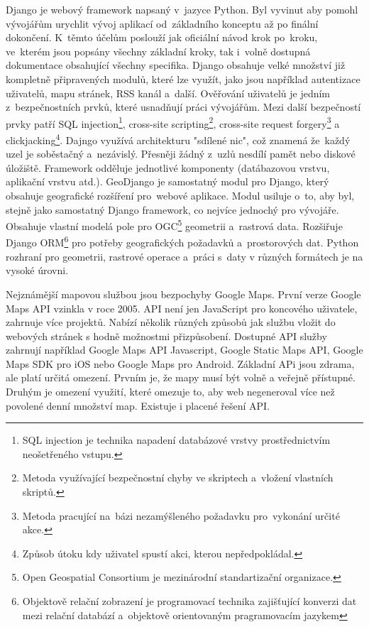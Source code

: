 \documentclass[12pt]{article}%
\begin{document}
{{%
Django je webový framework napsaný v~jazyce Python. Byl vyvinut aby pomohl vývojářům urychlit 
vývoj aplikací od~základního konceptu až po finální dokončení. K~těmto účelům poslouží jak oficiální 
návod krok po~kroku, ve~kterém jsou popsány všechny základní kroky, tak i~volně dostupná 
dokumentace obsahující všechny specifika. Django obsahuje velké množství již kompletně připravených 
modulů, které lze využít, jako jsou například autentizace uživatelů, mapu stránek, RSS kanál a~další. 
Ověřování uživatelů je jedním z~bezpečnostních prvků, které usnadňují práci vývojářům. Mezi další
bezpečností prvky patří SQL injection\footnote{SQL injection je technika napadení databázové vrstvy 
prostřednictvím neošetřeného vstupu.}, cross-site scripting\footnote{Metoda využívající bezpečnostní 
chyby ve skriptech a~vložení vlastních skriptů.}, cross-site request forgery\footnote{Metoda 
pracující na~bázi nezamýšleného požadavku pro~vykonání určité akce.} a clickjacking\footnote{Způsob 
útoku kdy uživatel spustí akci, kterou nepředpokládal.}. Dajngo využívá architekturu "sdílené nic", 
což znamená že~každý uzel je soběstačný a~nezávislý. Přesněji žádný z~uzlů nesdílí pamět nebo 
diskové úložiště. Framework odděluje jednotlivé komponenty (datábazovou vrstvu, aplikační vrstvu 
atd.).
GeoDjango je samostatný modul pro Django, který obsahuje geografické rozšíření pro~webové aplikace. 
Modul usiluje o~to, aby byl, stejně jako samostatný Django framework, co nejvíce jednochý pro 
vývojáře. Obsahuje vlastní modelá pole pro OGC\footnote{Open Geospatial Consortium je mezinárodní 
standartizační organizace.} geometrii a~rastrová data. Rozšiřuje Django ORM\footnote{Objektově 
relační zobrazení je programovací technika zajišťující konverzi dat mezi relační databází 
a~objektově orientovaným pragramovacím jazykem} pro potřeby geografických požadavků a~prostorových 
dat. Python rozhraní pro geometrii, rastrové operace a~práci s~daty v různých formátech je na 
vysoké úrovni.

Nejznámější mapovou službou jsou bezpochyby Google Maps. První verze Google Maps API vzinkla 
v roce 2005. API není jen JavaScript pro koncového uživatele, zahrnuje více projektů. Nabízí 
několik různých způsobů jak službu vložit do webových stránek s hodně možnostmi přizpůsobení. 
Dostupné API služby zahrnují například Google Maps API Javascript, Google Static Maps API, Google 
Maps SDK pro iOS nebo Google Maps pro Android. Základní APi jsou zdrama, ale platí určitá omezení. 
Prvním je, že mapy musí být volně a veřejně přístupné. Druhým je omezení využití, které omezuje to, 
aby web negeneroval více než povolené denní množství map. Existuje i placené řešení API.

}}
\end{document}
